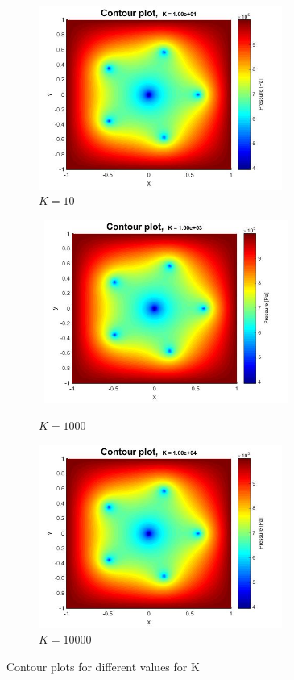 \documentclass[a4paper]{report}
\begin{document}
\begin{figure}
\begin{subfigure}{.45\textwidth}
	\centering
	\includegraphics[width=8cm]{K10_contour.jpg}
	\caption{$K=10$}
	\label{fig:sub4}
\end{subfigure}
	\begin{subfigure}{.45\textwidth}
	\centering\
	\includegraphics[width=8cm]{K1000_contour.jpg}
	\caption{$K=1000$}
	\label{fig:sub3}
\end{subfigure}%
\begin{subfigure}{.45\textwidth}
	\centering
	\includegraphics[width=8cm]{K10000_contour.jpg}
	\caption{$K=10000$}
	\label{fig:sub4}
\end{subfigure}
	\caption{Contour plots for different values for K}
	\label{fig:test}
\end{figure}
\end{document}

